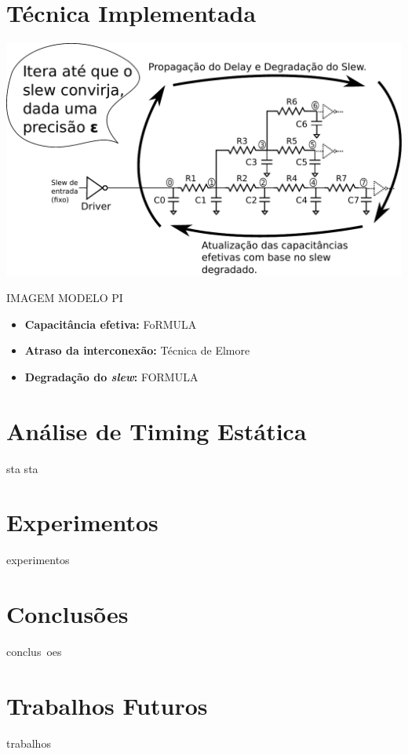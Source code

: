 \documentclass[10pt,a4paper]{beamer}
\begin{document}
	\section{Técnica Implementada}
	
		\begin{frame}
			\includegraphics[width=\textwidth]{img/imagem_puri.pdf} 
		\end{frame}
		
		\begin{frame}
			\begin{minipage}{0.45\textwidth}
				IMAGEM MODELO PI
			\end{minipage}
			\begin{minipage}{0.45\textwidth}
				\begin{itemize}
					\item \textbf{Capacitância efetiva:} FoRMULA
					\item \textbf{Atraso da interconexão:} Técnica de Elmore
					\item \textbf{Degradação do \textit{slew}: } FORMULA
				\end{itemize}
			\end{minipage}
		\end{frame}
	
	\section{Análise de Timing Estática}
	
		\begin{frame}
		sta sta
		\end{frame}
	
	\section{Experimentos}
	
		\begin{frame}
		experimentos
		\end{frame}
	
	\section{Conclusões}
	
		\begin{frame}
		conclus~oes
		\end{frame}
	
	\section{Trabalhos Futuros}
		
		\begin{frame}
		trabalhos
		\end{frame}
	
\end{document}
